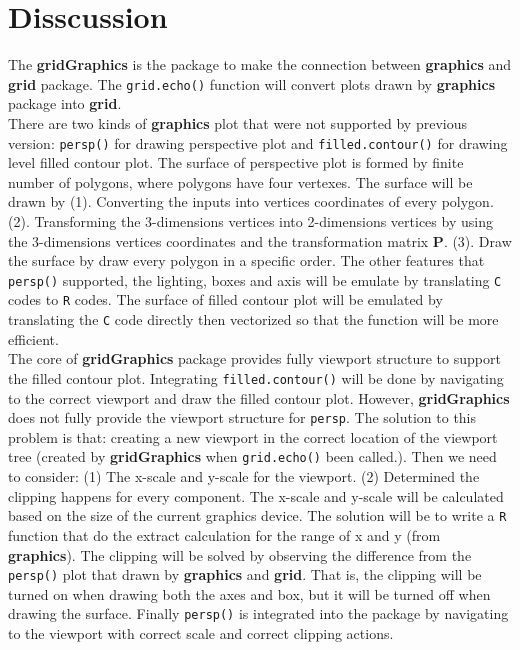 \documentclass[11pt]{report}
\begin{document}
\section{Disscussion}
The \textbf{gridGraphics} is the package to make the connection between \textbf{graphics} and \textbf{grid} package. The \texttt{grid.echo()} function will convert plots drawn by \textbf{graphics} package into \textbf{grid}.\\

There are two kinds of \textbf{graphics} plot that were not supported by previous version: \texttt{persp()} for drawing perspective plot and \texttt{filled.contour()} for drawing level filled contour plot. The surface of perspective plot is formed by finite number of polygons, where polygons have four vertexes. The surface will be drawn by (1). Converting the inputs into vertices coordinates of every polygon. (2). Transforming the 3-dimensions vertices into 2-dimensions vertices by using the 3-dimensions vertices coordinates and the transformation matrix \textbf{P}. (3). Draw the surface by draw every polygon in a specific order. The other features that \texttt{persp()} supported, the lighting, boxes and axis will be emulate by translating \texttt{C} codes to \texttt{R} codes. The surface of filled contour plot will be emulated by translating the \texttt{C} code directly then vectorized so that the function will be more efficient. \\

The core of \textbf{gridGraphics} package provides fully viewport structure to support the filled contour plot. Integrating \texttt{filled.contour()} will be done by navigating to the correct viewport and draw the filled contour plot. However, \textbf{gridGraphics} does not fully provide the viewport structure for \texttt{persp}. The solution to this problem is that: creating a new viewport in the correct location of the viewport tree (created by \textbf{gridGraphics} when \texttt{grid.echo()} been called.). Then we need to consider: (1) The x-scale and y-scale for the viewport. (2) Determined the clipping happens for every component. The x-scale and y-scale will be calculated based on the size of the current graphics device. The solution will be to write a \texttt{R} function that do the extract calculation for the range of x and y (from \textbf{graphics}). The clipping will be solved by observing the difference from the \texttt{persp()} plot that drawn by \textbf{graphics} and \textbf{grid}. That is, the clipping will be turned on when drawing both the axes and box, but it will be turned off when drawing the surface. Finally \texttt{persp()} is integrated into the package by navigating to the viewport with correct scale and correct clipping actions.\\
\end{document}
